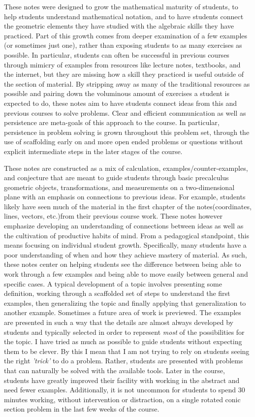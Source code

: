 \begin{annotation}
These notes were designed to grow the mathematical maturity of students, to help students understand mathematical notation, and to have students connect the geometric elements they have studied with the algebraic skills they have practiced. Part of this growth comes from deeper examination of a few examples (or sometimes just one), rather than exposing students to as many exercises as possible. In particular, students can often be successful in previous courses through mimicry of examples from resources like lecture notes, textbooks, and the internet, but they are missing how a skill they practiced is useful outside of the section of material. By stripping away as many of the traditional resources as possible and pairing down the voluminous amount of exercises a student is expected to do, these notes aim to have students connect ideas from this and previous courses to solve problems. Clear and efficient communication as well as persistence are meta-goals of this approach to the course. In particular, persistence in problem solving is grown throughout this problem set, through the use of scaffolding early on and more open ended problems or questions without explicit intermediate steps in the later stages of the course.

These notes are constructed as a mix of calculation, examples/counter-examples, and conjecture that are meant to guide students through basic precalculus geometric objects, transformations, and measurements on a two-dimensional plane with an emphasis on connections to previous ideas. For example, students likely have seen much of the material in the first chapter of the notes(coordinates, lines, vectors, etc.)from their previous course work. These notes however emphasize developing an understanding of connections between ideas as well as the cultivation of productive habits of mind. From a pedagogical standpoint, this means focusing on individual student growth. Specifically, many students have a poor understanding of when and how they achieve mastery of material. As such, these notes center on helping students see the difference between being able to work through a few examples and being able to move easily between general and specific cases. A typical development of a topic involves presenting some definition, working through a scaffolded set of steps to understand the first examples, then generalizing the topic and finally applying that generalization to another example. Sometimes a future area of work is previewed. The examples are presented in such a way that the details are almost always developed by students and typically selected in order to represent \textit{most} of the possibilities for the topic. I have tried as much as possible to guide students without expecting them to be clever. By this I mean that I am not trying to rely on students seeing the right \textit{'trick'} to do a problem. Rather, students are presented with problems that can naturally be solved with the available tools. Later in the course, students have greatly improved their facility with working in the abstract and need fewer examples. Additionally, it is not uncommon for students to spend 30 minutes working, without intervention or distraction, on a single rotated conic section problem in the last few weeks of the course.



\end{annotation}
